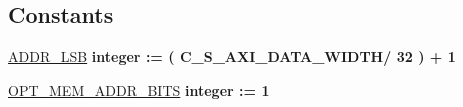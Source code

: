\subsection*{Constants}
 \begin{DoxyCompactItemize}
\item 
\hypertarget{group__my_g_p_i_o_ga92f00d1b43f901f1bf5684d1e79aab84}{\hyperlink{group__my_g_p_i_o_ga92f00d1b43f901f1bf5684d1e79aab84}{A\+D\+D\+R\+\_\+\+L\+S\+B} {\bfseries \textcolor{vhdlchar}{integer}\textcolor{vhdlchar}{ }\textcolor{vhdlchar}{ }\textcolor{vhdlchar}{\+:}\textcolor{vhdlchar}{=}\textcolor{vhdlchar}{ }\textcolor{vhdlchar}{(}\textcolor{vhdlchar}{ }\textcolor{vhdlchar}{ }\textcolor{vhdlchar}{ }\textcolor{vhdlchar}{ }\textcolor{vhdlchar}{C\+\_\+\+S\+\_\+\+A\+X\+I\+\_\+\+D\+A\+T\+A\+\_\+\+W\+I\+D\+T\+H}\textcolor{vhdlchar}{/}\textcolor{vhdlchar}{ } \textcolor{vhdldigit}{32} \textcolor{vhdlchar}{ }\textcolor{vhdlchar}{)}\textcolor{vhdlchar}{ }\textcolor{vhdlchar}{+}\textcolor{vhdlchar}{ } \textcolor{vhdldigit}{1} \textcolor{vhdlchar}{ }} }\label{group__my_g_p_i_o_ga92f00d1b43f901f1bf5684d1e79aab84}

\item 
\hypertarget{group__my_g_p_i_o_ga3482a055a516370a7032b60492b444e7}{\hyperlink{group__my_g_p_i_o_ga3482a055a516370a7032b60492b444e7}{O\+P\+T\+\_\+\+M\+E\+M\+\_\+\+A\+D\+D\+R\+\_\+\+B\+I\+T\+S} {\bfseries \textcolor{vhdlchar}{integer}\textcolor{vhdlchar}{ }\textcolor{vhdlchar}{ }\textcolor{vhdlchar}{\+:}\textcolor{vhdlchar}{=}\textcolor{vhdlchar}{ }\textcolor{vhdlchar}{ } \textcolor{vhdldigit}{1} \textcolor{vhdlchar}{ }} }\label{group__my_g_p_i_o_ga3482a055a516370a7032b60492b444e7}

\end{DoxyCompactItemize}

